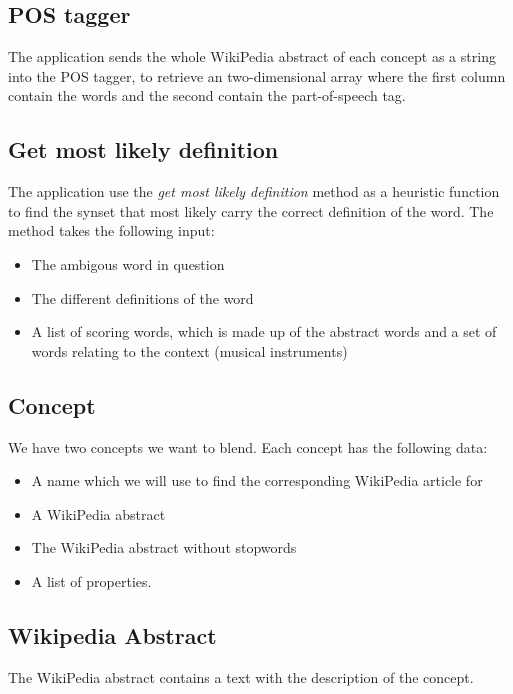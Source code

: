 \subsection{POS tagger}
The application sends the whole WikiPedia abstract of each concept as a string into the POS tagger, to retrieve an two-dimensional array where the first column contain the words and the second contain the part-of-speech tag.

\subsection{Get most likely definition}
The application use the \emph{get most likely definition} method as a heuristic function to find the synset that most likely carry the correct definition of the word. The method takes the following input:
\begin{itemize}
	\item The ambigous word in question
	\item The different definitions of the word
	\item A list of scoring words, which is made up of the abstract words and a set of words relating to the context (musical instruments)
\end{itemize}


\subsection{Concept}
We have two concepts we want to blend. Each concept has the following data:
\begin{itemize}
\item A name which we will use to find the corresponding WikiPedia article for
\item A WikiPedia abstract
\item The WikiPedia abstract without stopwords
\item A list of properties.
\end{itemize}

\subsection{Wikipedia Abstract}
The WikiPedia abstract contains a text with the description of the concept.

